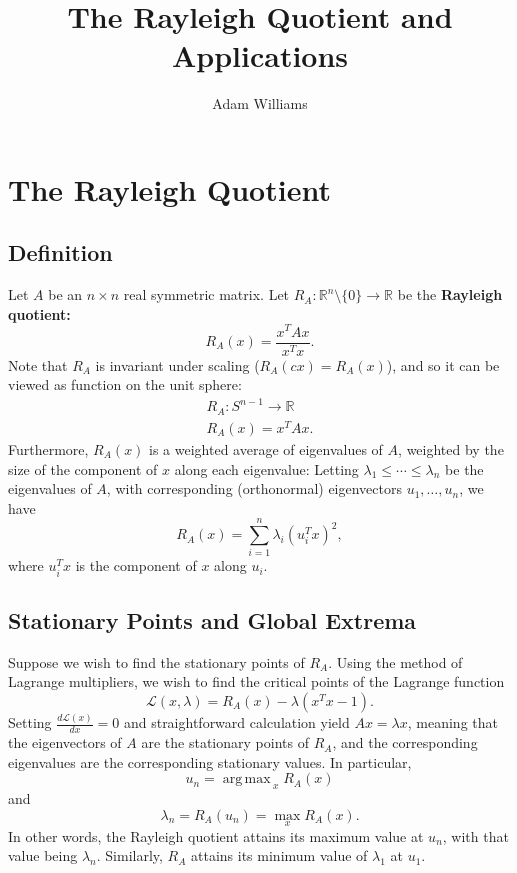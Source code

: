 \documentclass[reqno]{amsart}
\title{The Rayleigh Quotient and Applications}
\author{Adam Williams}
\DeclareMathOperator*{\argmax}{arg\,max\,}
\numberwithin{equation}{section}
\begin{document}
\maketitle

\section{The Rayleigh Quotient}

\subsection{Definition}

Let $A$ be an $n \times n$ real symmetric matrix.
Let $R_A : \mathbb R^n \setminus \{0\} \to \mathbb R$ be the \textbf{Rayleigh
quotient:}
$$
    R_A(x) = \frac{x^T Ax}{x^T x}.
$$
Note that $R_A$ is invariant under scaling ($R_A(cx) = R_A(x)$), and so
it can be viewed as function on the unit sphere:
\begin{align*}
    R_A : S^{n-1} \to \mathbb{R} \\
    R_A(x) = x^T A x.
\end{align*}
Furthermore, $R_A(x)$ is a weighted average of eigenvalues of $A$, weighted by
the size of the component of $x$ along each eigenvalue: Letting $\lambda_1
\le \cdots \le \lambda_n$ be the eigenvalues of $A$, with corresponding
(orthonormal) eigenvectors $u_1, \ldots, u_n$, we have
\begin{equation}
    R_A(x) = \sum_{i=1}^n \lambda_i (u_i^T x)^2,
\label{eigen}
\end{equation}
where $u_i^Tx$ is the component of $x$ along $u_i$.

\subsection{Stationary Points and Global Extrema}

Suppose we wish to find the stationary points of $R_A$.
Using the method of Lagrange multipliers,
we wish to find the critical points of the Lagrange function
$$
    \mathcal L(x, \lambda) = R_A(x) - \lambda (x^T x - 1).
$$
Setting $\frac{ d \mathcal L(x)}{d x} = 0$ and straightforward calculation
yield $Ax = \lambda x$, meaning that the eigenvectors of $A$ are the
stationary points of $R_A$, and the corresponding eigenvalues are
the corresponding stationary values. In particular,
$$
    u_n = \argmax_x R_A(x)
$$
and
$$
    \lambda_n = R_A(u_n) = \max_x R_A(x).
$$
In other words, the Rayleigh quotient attains its maximum value at $u_n$,
with that value being $\lambda_n$. Similarly, $R_A$ attains its minimum
value of $\lambda_1$ at $u_1$.
\end{document}
